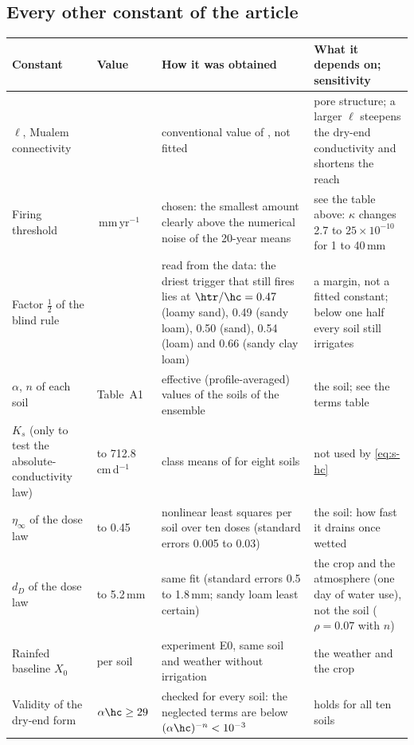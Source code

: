 \subsection{Every other constant of the article}
{\small\begin{longtable}{>{\raggedright\arraybackslash}p{}>{\raggedright\arraybackslash}p{}>{\raggedright\arraybackslash}p{}>{\raggedright\arraybackslash}p{}}
\toprule Constant & Value & How it was obtained & What it depends on; sensitivity\\\midrule\endhead
$\ell$, Mualem connectivity & 0.5 & conventional value of \citet{Mualem1976}, not fitted & pore structure; a larger $\ell$ steepens the dry-end conductivity and shortens the reach\\
Firing threshold & 5\,mm\,yr$^{-1}$ & chosen: the smallest amount clearly above the numerical noise of the 20-year means & see the table above: $\kappa$ changes 2.7 to $25\times10^{-10}$ for 1 to 40\,mm\\
Factor $\tfrac12$ of the blind rule & 0.5 & read from the data: the driest trigger that still fires lies at $\htr/\hc=0.47$ (loamy sand), 0.49 (sandy loam), 0.50 (sand), 0.54 (loam) and 0.66 (sandy clay loam) & a margin, not a fitted constant; below one half every soil still irrigates\\
$\alpha$, $n$ of each soil & Table~A1 & effective (profile-averaged) values of the soils of the ensemble & the soil; see the terms table\\
$K_s$ (only to test the absolute-conductivity law) & 1.68 to 712.8\,cm\,d$^{-1}$ & class means of \citet{Carsel1988} for eight soils & not used by \cref{eq:s-hc}\\
$\eta_\infty$ of the dose law & 0.10 to 0.45 & nonlinear least squares per soil over ten doses (standard errors 0.005 to 0.03) & the soil: how fast it drains once wetted\\
$d_D$ of the dose law & 3.2 to 5.2\,mm & same fit (standard errors 0.5 to 1.8\,mm; sandy loam least certain) & the crop and the atmosphere (one day of water use), not the soil ($\rho=0.07$ with $n$)\\
Rainfed baseline $X_0$ & per soil & experiment E0, same soil and weather without irrigation & the weather and the crop\\
Validity of the dry-end form & $\alpha\hc\ge29$ & checked for every soil: the neglected terms are below $(\alpha\hc)^{-n}<10^{-3}$ & holds for all ten soils\\\bottomrule
\end{longtable}}
